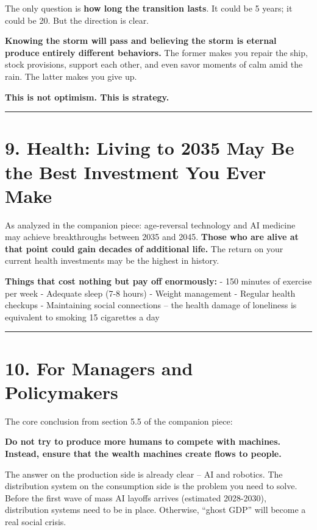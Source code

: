 The only question is \textbf{how long the transition lasts}. It could be
5 years; it could be 20. But the direction is clear.

\textbf{Knowing the storm will pass and believing the storm is eternal
produce entirely different behaviors.} The former makes you repair the
ship, stock provisions, support each other, and even savor moments of
calm amid the rain. The latter makes you give up.

\textbf{This is not optimism. This is strategy.}

\begin{center}\rule{0.5\linewidth}{0.5pt}\end{center}

\section{9. Health: Living to 2035 May Be the Best Investment You Ever
Make}\label{health-living-to-2035-may-be-the-best-investment-you-ever-make}

As analyzed in the companion piece: age-reversal technology and AI
medicine may achieve breakthroughs between 2035 and 2045. \textbf{Those
who are alive at that point could gain decades of additional life.} The
return on your current health investments may be the highest in history.

\textbf{Things that cost nothing but pay off enormously:} - 150 minutes
of exercise per week - Adequate sleep (7-8 hours) - Weight management -
Regular health checkups - Maintaining social connections -- the health
damage of loneliness is equivalent to smoking 15 cigarettes a day

\begin{center}\rule{0.5\linewidth}{0.5pt}\end{center}

\section{10. For Managers and
Policymakers}\label{for-managers-and-policymakers}

The core conclusion from section 5.5 of the companion piece:

\textbf{Do not try to produce more humans to compete with machines.
Instead, ensure that the wealth machines create flows to people.}

The answer on the production side is already clear -- AI and robotics.
The distribution system on the consumption side is the problem you need
to solve. Before the first wave of mass AI layoffs arrives (estimated
2028-2030), distribution systems need to be in place. Otherwise, ``ghost
GDP'' will become a real social crisis.

